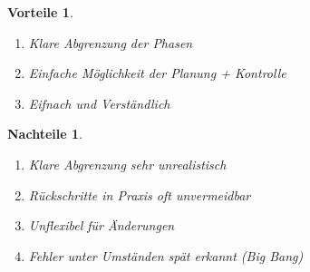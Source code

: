 \documentclass[a4paper]{article}
\theoremstyle{break}
\newtheorem{why}{Vorteile}[section]
\newtheorem{whynot}{Nachteile}[section]
\begin{document}
\begin {why}
  \begin {enumerate}
    \item Klare Abgrenzung der Phasen
    \item Einfache Möglichkeit der Planung + Kontrolle
      \item Eifnach und Verständlich
  \end {enumerate}
  
\end {why}
\begin {whynot}
  \begin {enumerate}
  \item Klare Abgrenzung sehr unrealistisch
  \item Rückschritte in Praxis oft unvermeidbar
  \item Unflexibel für Änderungen
  \item Fehler unter Umständen spät erkannt (Big Bang)
  \end {enumerate}
\end {whynot}
\end{document}

